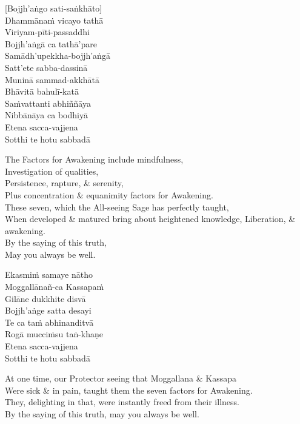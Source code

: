 \vspace{-1em}

[Bojjh'aṅgo sati-saṅkhāto]\\
Dhammānaṁ vicayo tathā\\
Viriyam-pīti-passaddhi\\
Bojjh'aṅgā ca tathā'pare\\
Samādh'upekkha-bojjh'aṅgā\\
Satt'ete sabba-dassinā\\
Muninā sammad-akkhātā\\
Bhāvitā bahulī-katā\\
Saṁvattanti abhiññāya\\
Nibbānāya ca bodhiyā\\
Etena sacca-vajjena\\
Sotthi te hotu sabbadā

\begin{english-verses}
  The Factors for Awakening include mindfulness,\\
  Investigation of qualities,\\
  Persistence, rapture, \& serenity,\\
  Plus concentration \& equanimity factors for Awakening.\\
  These seven, which the All-seeing Sage has perfectly taught,\\
  When developed \& matured bring about heightened knowledge, Liberation, \& awakening.\\
  By the saying of this truth,\\
  May you always be well.
\end{english-verses}

Ekasmiṁ samaye nātho\\
Moggallānañ-ca Kassapaṁ\\
Gilāne dukkhite disvā\\
Bojjh'aṅge satta desayi\\
Te ca taṁ abhinanditvā\\
Rogā mucciṁsu taṅ-khaṇe\\
Etena sacca-vajjena\\
Sotthi te hotu sabbadā

\begin{english-verses}
  At one time, our Protector seeing that Moggallana \& Kassapa\\
  Were sick \& in pain, taught them the seven factors for Awakening.\\
  They, delighting in that, were instantly freed from their illness.\\
  By the saying of this truth, may you always be well.
\end{english-verses}

